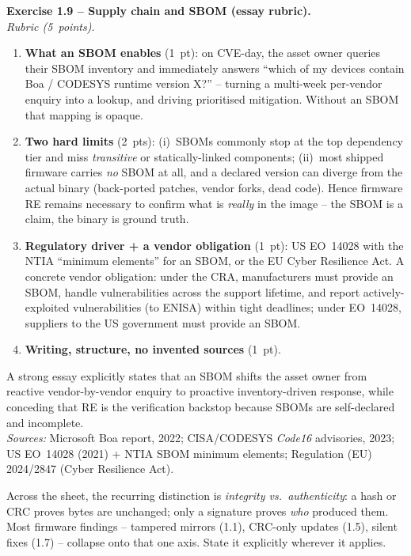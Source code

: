 \documentclass[11pt,a4paper]{article}
\begin{document}
\begin{solutionbox}
\textbf{Exercise 1.9 -- Supply chain and SBOM (essay rubric).}\\[2pt]
\emph{Rubric (5~points).}
\begin{enumerate}\setlength{\itemsep}{0pt}
  \item \textbf{What an SBOM enables} (1~pt): on CVE-day, the asset owner queries their SBOM
        inventory and immediately answers ``which of my devices contain Boa / CODESYS runtime
        version X?'' -- turning a multi-week per-vendor enquiry into a lookup, and driving
        prioritised mitigation. Without an SBOM that mapping is opaque.
  \item \textbf{Two hard limits} (2~pts): (i)~SBOMs commonly stop at the top dependency tier and
        miss \emph{transitive} or statically-linked components; (ii)~most shipped firmware
        carries \emph{no} SBOM at all, and a declared version can diverge from the actual binary
        (back-ported patches, vendor forks, dead code). Hence firmware RE remains necessary to
        confirm what is \emph{really} in the image -- the SBOM is a claim, the binary is ground
        truth.
  \item \textbf{Regulatory driver + a vendor obligation} (1~pt): US EO~14028 with the NTIA
        ``minimum elements'' for an SBOM, or the EU Cyber Resilience Act. A concrete vendor
        obligation: under the CRA, manufacturers must provide an SBOM, handle vulnerabilities
        across the support lifetime, and report actively-exploited vulnerabilities (to ENISA)
        within tight deadlines; under EO~14028, suppliers to the US government must provide an
        SBOM.
  \item \textbf{Writing, structure, no invented sources} (1~pt).
\end{enumerate}
A strong essay explicitly states that an SBOM shifts the asset owner from reactive
vendor-by-vendor enquiry to proactive inventory-driven response, while conceding that RE is the
verification backstop because SBOMs are self-declared and incomplete.\\[2pt]
\emph{Sources:} Microsoft Boa report, 2022; CISA/CODESYS \emph{Code16} advisories, 2023; US
EO~14028 (2021) + NTIA SBOM minimum elements; Regulation (EU) 2024/2847 (Cyber Resilience Act).
\end{solutionbox}

\begin{hintbox}
Across the sheet, the recurring distinction is \emph{integrity vs.\ authenticity}: a hash or CRC
proves bytes are unchanged; only a signature proves \emph{who} produced them. Most firmware
findings -- tampered mirrors (1.1), CRC-only updates (1.5), silent fixes (1.7) -- collapse onto
that one axis. State it explicitly wherever it applies.
\end{hintbox}
\end{document}
